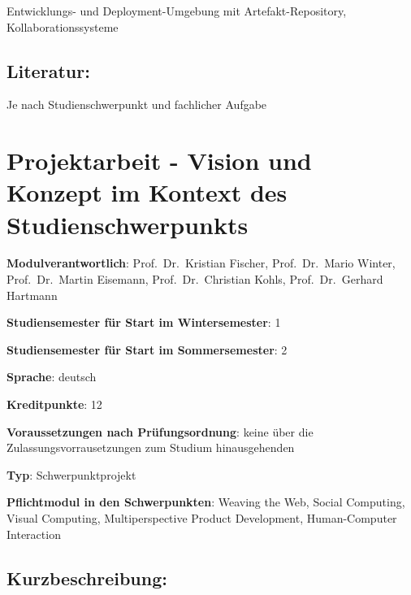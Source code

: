 Entwicklungs- und Deployment-Umgebung mit Artefakt-Repository,
Kollaborationssysteme

\section*{Literatur:}\label{literatur-9}

Je nach Studienschwerpunkt und fachlicher Aufgabe

\chapter{Projektarbeit - Vision und Konzept im Kontext des
Studienschwerpunkts}\label{projektarbeit---vision-und-konzept-im-kontext-des-studienschwerpunkts}

\begin{modulHead}
\textbf{Modulverantwortlich}: Prof.~Dr.~Kristian
Fischer, Prof.~Dr.~Mario Winter, Prof.~Dr.~Martin Eisemann,
Prof.~Dr.~Christian Kohls, Prof.~Dr.~Gerhard
Hartmann
\end{modulHead}
\begin{modulHead}
\textbf{Studiensemester für
Start im Wintersemester}:
1
\end{modulHead}
\begin{modulHead}
\textbf{Studiensemester für Start
im Sommersemester}:
2
\end{modulHead}
\begin{modulHead}
\textbf{Sprache}:
deutsch
\end{modulHead}
\begin{modulHead}
\textbf{Kreditpunkte}:
12
\end{modulHead}
\begin{modulHead}
\textbf{Voraussetzungen nach
Prüfungsordnung}: keine über die Zulassungsvorrausetzungen zum Studium
hinausgehenden
\end{modulHead}
\begin{modulHead}
\textbf{Typ}:
Schwerpunktprojekt
\end{modulHead}
\begin{modulHead}
\textbf{Pflichtmodul
in den Schwerpunkten}: Weaving the Web, Social Computing, Visual
Computing, Multiperspective Product Development, Human-Computer
Interaction
\end{modulHead}


\section*{Kurzbeschreibung:}\label{kurzbeschreibung-5}

